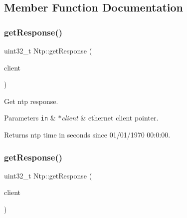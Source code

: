 \subsection{Member Function Documentation}
\mbox{\label{classNtp_a6df9e799d7fb829ff163ea14a70f6999}} 
\subsubsection{\texorpdfstring{get\+Response()}{getResponse()}\hspace{0.1cm}{\footnotesize\ttfamily [1/2]}}
{\footnotesize\ttfamily uint32\+\_\+t Ntp\+::get\+Response (\begin{DoxyParamCaption}\item[{Ethernet\+U\+DP $\ast$}]{client }\end{DoxyParamCaption})\hspace{0.3cm}{\ttfamily [static]}}



Get ntp response. 


\begin{DoxyParams}[1]{Parameters}
\mbox{\tt in}  & {\em $\ast$client} & ethernet client pointer. \\
\hline
\end{DoxyParams}
\begin{DoxyReturn}{Returns}
ntp time in seconds since 01/01/1970 00\+:0\+:00. 
\end{DoxyReturn}
\mbox{\label{classNtp_a6456f082f6b3012f72c5064e45791ddd}} 
\subsubsection{\texorpdfstring{get\+Response()}{getResponse()}\hspace{0.1cm}{\footnotesize\ttfamily [2/2]}}
{\footnotesize\ttfamily uint32\+\_\+t Ntp\+::get\+Response (\begin{DoxyParamCaption}\item[{\hyperlink{classsim800Client}{sim800\+Client} $\ast$}]{client }\end{DoxyParamCaption})\hspace{0.3cm}{\ttfamily [static]}}



